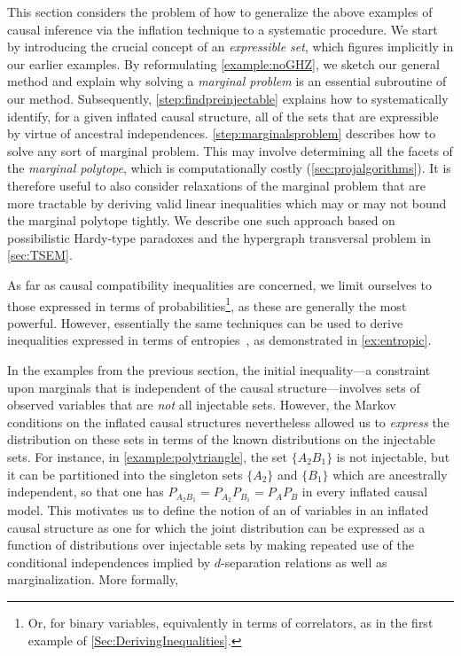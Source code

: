 \documentclass[aps,english,10pt,superscriptaddress,onecolumn,twoside,longbibliography,pra,floatfix,fleqn,nofootinbib]{revtex4-1}
\newcommand*{\tblue}[1]{{\color{medblue}{\textbf{#1}}}}
\theoremstyle{definition}
\newcounter{example}[section]
\begin{document}
This section considers the problem of how to generalize the above examples of causal inference via the inflation technique to a systematic procedure. We start by introducing the crucial concept of an \emph{expressible set},
 which figures implicitly in our earlier examples. By reformulating \cref{example:noGHZ}, we sketch our general method and explain why solving a \emph{marginal problem} is an essential subroutine of our method. Subsequently, \cref{step:findpreinjectable} explains how to systematically identify, for a given inflated causal structure, all of the 
 sets that are expressible by virtue of ancestral independences.
 \cref{step:marginalsproblem} describes how to solve any sort of marginal problem. This may involve determining all the facets of the \emph{marginal polytope}, which is computationally costly (\cref{sec:projalgorithms}).  It is therefore useful to also consider relaxations of the marginal problem that are more tractable by deriving valid linear inequalities which may or may not bound the marginal polytope tightly. We describe one such approach based on possibilistic Hardy-type paradoxes and the hypergraph transversal problem in \cref{sec:TSEM}.

As far as causal compatibility inequalities are concerned, we limit ourselves to those expressed in terms of probabilities\footnote{Or, for binary variables, equivalently in terms of correlators, as in the first example of \cref{Sec:DerivingInequalities}.}, as these are generally the most powerful. However, essentially the same techniques can be used to derive inequalities expressed in terms of entropies~\cite{fritz2013marginal}, as demonstrated in \cref{ex:entropic}. 

In the examples from the previous section, the initial inequality---a constraint upon marginals that is independent of the causal structure---involves sets of observed variables that are \emph{not} all injectable sets. However, the Markov conditions on the inflated causal structures nevertheless allowed us to \emph{express} the distribution on these sets in terms of the known distributions on the injectable sets. For instance, in \cref{example:polytriangle}, the set $\{ A_2 B_1\}$ is not injectable, but it can be partitioned into the singleton sets $\{ A_2 \}$ and $\{ B_1\}$ which are ancestrally independent, so that one has $P_{A_2 B_1} = P_{A_2} P_{B_1} = P_A P_B$ in every inflated causal model.  This motivates us to define the notion of an \tblue{expressible set} of variables in an inflated causal structure as one for which the joint distribution can be expressed as a function of distributions over injectable sets by making repeated use of the conditional independences implied by $d$-separation relations as well as marginalization. More formally,
\end{document}
